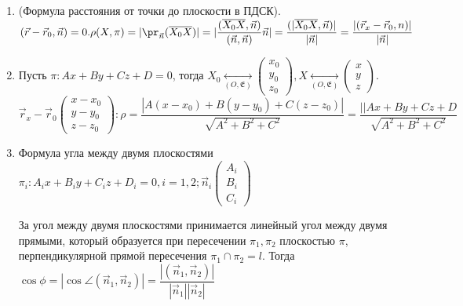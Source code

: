 \begin{enumerate}
	\item (Формула расстояния от точки до плоскости в ПДСК). \((\vec r - \vec r_0, \vec n) = 0. \rho(X,\pi) = |\pr_{\vec n}(\overline{X_0X})| = |\dfrac{(\overline{X_0X}, \vec n)}{(\vec n, \vec n)}\vec n| = \dfrac{(|\overline{X_0X}, \vec n)|}{|\vec{n}|} = \dfrac{|(\vec r_x - \vec r_0, n)|}{|\vec n|}\)
	\item Пусть \(\pi: Ax+By+Cz+D = 0\), тогда \(X_0\underset{(O,\mathfrak{E})}{\longleftrightarrow}\begin{pmatrix}
	x_0 \\ y_0 \\ z_0
	\end{pmatrix}, 
	X\underset{(O,\mathfrak{E})}{\longleftrightarrow}\begin{pmatrix}
		x \\ y \\ z
	\end{pmatrix}\). \(\vec r_x - \vec r_0 \begin{pmatrix}
	x- x_0 \\ y - y_0 \\ z-z_0
	\end{pmatrix}: \rho = \dfrac{|A(x-x_0)+B(y-y_0)+C(z-z_0)|}{\sqrt{A^2+B^2+C^2}} = \dfrac{||Ax+By+Cz+D}{\sqrt{A^2+B^2+C^2}}\)
	\item Формула угла между двумя плоскостями
	\(\pi_i: A_ix+B_iy+C_iz+D_i = 0, i = 1, 2; \vec n_i\begin{pmatrix}
		A_i \\ B_i \\ C_i
	\end{pmatrix}\)
	\begin{definition}
		За угол между двумя плоскостями принимается линейный угол между двумя прямыми, который образуется при пересечении $\pi_1, \pi_2$ плоскостью \(\pi\), перпендикулярной прямой пересечения \(\pi_1\cap \pi_2 = l\). Тогда \(\cos \phi = |\cos\angle(\vec n_1, \vec n_2)| = \dfrac{|(\vec n_1, \vec n_2)|}{|\vec n_1||\vec n_2|}\)
	\end{definition}
\end{enumerate}
